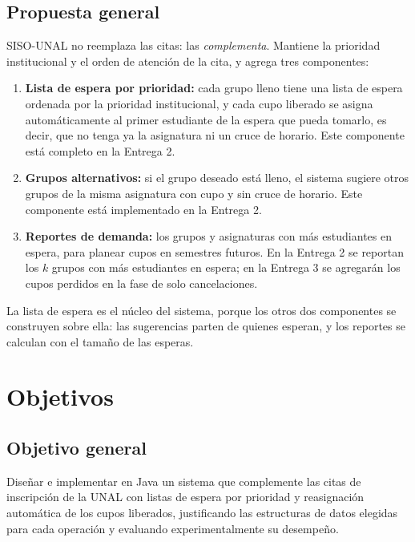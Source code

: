 \documentclass[conference]{IEEEtran}
\begin{document}
\subsection{Propuesta general}
SISO-UNAL no reemplaza las citas: las \emph{complementa}. Mantiene la prioridad institucional y el orden de atención de la cita, y agrega tres componentes:
\begin{enumerate}
    \item \textbf{Lista de espera por prioridad:} cada grupo lleno tiene una lista de espera ordenada por la prioridad institucional, y cada cupo liberado se asigna automáticamente al primer estudiante de la espera que pueda tomarlo, es decir, que no tenga ya la asignatura ni un cruce de horario. Este componente está completo en la Entrega 2.
    \item \textbf{Grupos alternativos:} si el grupo deseado está lleno, el sistema sugiere otros grupos de la misma asignatura con cupo y sin cruce de horario. Este componente está implementado en la Entrega 2.
    \item \textbf{Reportes de demanda:} los grupos y asignaturas con más estudiantes en espera, para planear cupos en semestres futuros. En la Entrega 2 se reportan los $k$ grupos con más estudiantes en espera; en la Entrega 3 se agregarán los cupos perdidos en la fase de solo cancelaciones.
\end{enumerate}
La lista de espera es el núcleo del sistema, porque los otros dos componentes se construyen sobre ella: las sugerencias parten de quienes esperan, y los reportes se calculan con el tamaño de las esperas.


\section{Objetivos}

\subsection{Objetivo general}
Diseñar e implementar en Java un sistema que complemente las citas de inscripción de la UNAL con listas de espera por prioridad y reasignación automática de los cupos liberados, justificando las estructuras de datos elegidas para cada operación y evaluando experimentalmente su desempeño.
\end{document}
